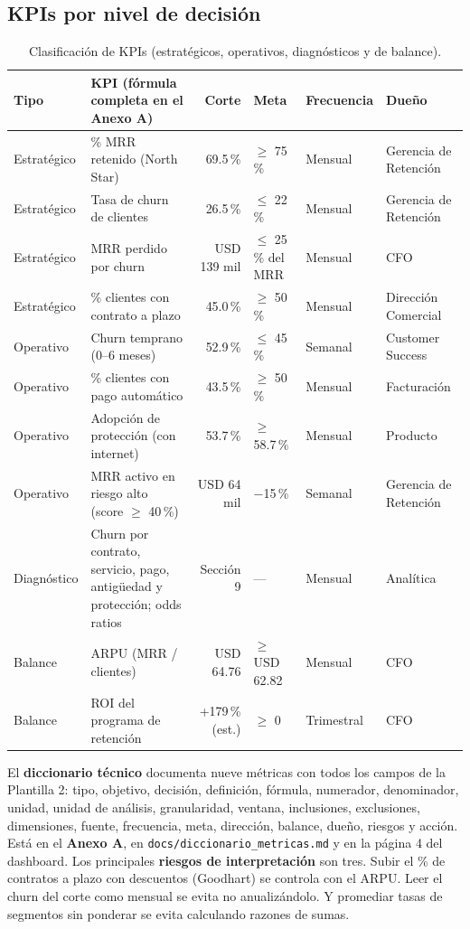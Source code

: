 \documentclass[10.5pt,a4paper]{article}
\begin{document}
\subsection{KPIs por nivel de decisión}
\begin{table}[H]
\centering\footnotesize
\caption{Clasificación de KPIs (estratégicos, operativos, diagnósticos y de balance).}
\begin{tabularx}{\textwidth}{@{}lXrlll@{}}
\toprule
Tipo & KPI (fórmula completa en el Anexo A) & Corte & Meta & Frecuencia & Dueño \\
\midrule
Estratégico & \% MRR retenido (North Star) & 69.5\,\% & $\geq$ 75\,\% & Mensual & Gerencia de Retención \\
Estratégico & Tasa de churn de clientes & 26.5\,\% & $\leq$ 22\,\% & Mensual & Gerencia de Retención \\
Estratégico & MRR perdido por churn & USD 139 mil & $\leq$ 25\,\% del MRR & Mensual & CFO \\
Estratégico & \% clientes con contrato a plazo & 45.0\,\% & $\geq$ 50\,\% & Mensual & Dirección Comercial \\
Operativo & Churn temprano (0–6 meses) & 52.9\,\% & $\leq$ 45\,\% & Semanal & Customer Success \\
Operativo & \% clientes con pago automático & 43.5\,\% & $\geq$ 50\,\% & Mensual & Facturación \\
Operativo & Adopción de protección (con internet) & 53.7\,\% & $\geq$ 58.7\,\% & Mensual & Producto \\
Operativo & MRR activo en riesgo alto (score $\geq$ 40\,\%) & USD 64 mil & −15\,\% & Semanal & Gerencia de Retención \\
Diagnóstico & Churn por contrato, servicio, pago, antigüedad y protección; odds ratios & Sección 9 & — & Mensual & Analítica \\
Balance & ARPU (MRR / clientes) & USD 64.76 & $\geq$ USD 62.82 & Mensual & CFO \\
Balance & ROI del programa de retención & +179\,\% (est.) & $\geq$ 0 & Trimestral & CFO \\
\bottomrule
\end{tabularx}
\end{table}

El \textbf{diccionario técnico} documenta nueve métricas con todos los campos de la Plantilla 2: tipo, objetivo, decisión, definición, fórmula, numerador, denominador, unidad, unidad de análisis, granularidad, ventana, inclusiones, exclusiones, dimensiones, fuente, frecuencia, meta, dirección, balance, dueño, riesgos y acción. Está en el \textbf{Anexo A}, en \texttt{docs/diccionario\_metricas.md} y en la página 4 del dashboard. Los principales \textbf{riesgos de interpretación} son tres. Subir el \% de contratos a plazo con descuentos (Goodhart) se controla con el ARPU. Leer el churn del corte como mensual se evita no anualizándolo. Y promediar tasas de segmentos sin ponderar se evita calculando razones de sumas.
\end{document}
